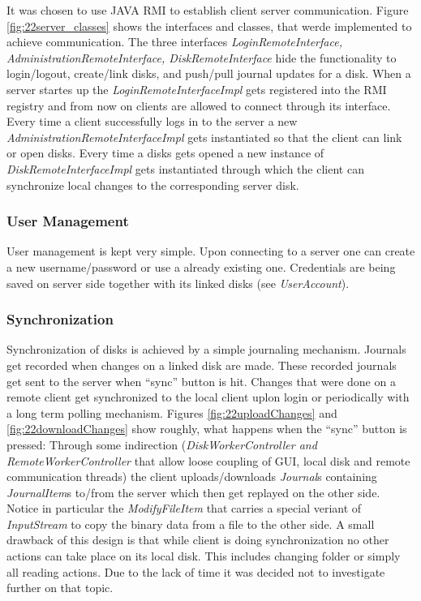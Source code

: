 It was chosen to use JAVA RMI to establish client server
communication. Figure \ref{fig:22server_classes} shows the interfaces and
classes, that werde implemented to achieve communication. The three interfaces
\textit{LoginRemoteInterface, AdministrationRemoteInterface,
DiskRemoteInterface} hide the functionality to login/logout, create/link disks,
and push/pull journal updates for a disk. When a server startes up the
\textit{LoginRemoteInterfaceImpl} gets registered into the RMI registry and from
now on clients are allowed to connect through its interface. Every time a
client successfully logs in to the server a new
\textit{AdministrationRemoteInterfaceImpl} gets instantiated so that the client can link or open disks. Every time a disks
gets opened a new instance of \textit{DiskRemoteInterfaceImpl} gets
instantiated through which the client can synchronize local changes to the
corresponding server disk.


\subsubsection{User Management}
User management is kept very simple. Upon connecting to a server one can
create a new username/password or use a already existing one. Credentials are
being saved on server side together with its linked disks (see
\textit{UserAccount}).

\subsubsection{Synchronization}
Synchronization of disks is achieved by a simple journaling mechanism. Journals
get recorded when changes on a linked disk are made. These recorded journals get
sent to the server when ``sync'' button is hit. Changes that were done on a
remote client get synchronized to the local client uplon login or periodically
with a long term polling mechanism. Figures \ref{fig:22uploadChanges} and
\ref{fig:22downloadChanges} show roughly, what happens when the ``sync'' button
is pressed: Through some indirection (\textit{DiskWorkerController and
RemoteWorkerController} that allow loose coupling of GUI, local disk and remote
communication threads) the client uploads/downloads \textit{Journal}s containing
\textit{JournalItem}s to/from the server which then get replayed on the other
side. Notice in particular the \textit{ModifyFileItem} that carries a special
veriant of \textit{InputStream} to copy the binary data from a file to the other
side. A small drawback of this design is that while client is doing
synchronization no other actions can take place on its local disk. This includes
changing folder or simply all reading actions. Due to the lack of time it was
decided not to investigate further on that topic.

